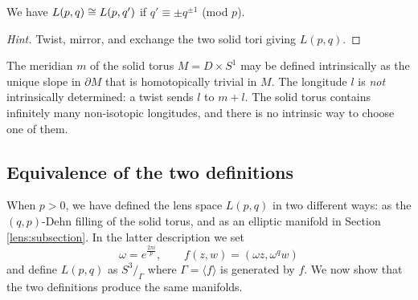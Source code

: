 \begin{ex} \label{pqpq:ex}
We have $L(p,q)\cong L(p,q')$ if $q' \equiv \pm q^{\pm 1}$ (mod $p$).
\end{ex}
\begin{proof}[Hint]
Twist, mirror, and exchange the two solid tori giving $L(p,q)$.
\end{proof}

\begin{rem}
The meridian $m$ of the solid torus $M=D\times S^1$ may be defined intrinsically as the unique slope in $\partial M$ that is homotopically trivial in $M$. The longitude $l$ is \emph{not} intrinsically determined: a twist sends $l$ to $m+l$. The solid torus contains infinitely many non-isotopic longitudes, and there is no intrinsic way to choose one of them.
\end{rem}

\subsection{Equivalence of the two definitions}
When $p>0$, we have defined the lens space $L(p,q)$ in two different ways: as the $(q,p)$-Dehn filling of the solid torus, and as an elliptic manifold in Section \ref{lens:subsection}. In the latter description we set
$$\omega = e^{\frac{2\pi i}p}, \qquad f(z,w) = (\omega z, \omega^qw)$$ 
and define $L(p,q)$ as $S^3/_\Gamma$ where $\Gamma = \langle f \rangle$ is generated by $f$. We now show that the two definitions produce the same manifolds.

